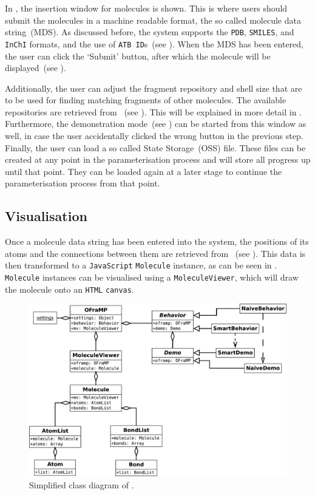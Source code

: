 In , the insertion window for molecules is shown. This is where users should submit the molecules in a machine readable format, the so called molecule data string~(MDS). As discussed before, the system supports the \verb|PDB|, \verb|SMILES|, and \verb|InChI| formats, and the use of \verb|ATB ID|s~(see ). When the MDS has been entered, the user can click the `Submit' button, after which the molecule will be displayed~(see ).

Additionally, the user can adjust the fragment repository and shell size that are to be used for finding matching fragments of other molecules. The available repositories are retrieved from \omfraf~(see ). This will be explained in more detail in . Furthermore, the demonstration mode~(see ) can be started from this window as well, in case the user accidentally clicked the wrong button in the previous step. Finally, the user can load a so called \oframp{} State Storage~(OSS) file. These files can be created at any point in the parameterisation process and will store all progress up until that point. They can be loaded again at a later stage to continue the parameterisation process from that point.


\subsection{Visualisation}
Once a molecule data string has been entered into the system, the positions of its atoms and the connections between them are retrieved from \oapoc~(see ). This data is then transformed to a \verb|JavaScript| \verb|Molecule| instance, as can be seen in . \verb|Molecule| instances can be visualised using a \verb|MoleculeViewer|, which will draw the molecule onto an \verb|HTML| \verb|canvas|.

\begin{figure}
\begin{center}
\includegraphics[width=\textwidth]{img/oframp_class.pdf}
\caption{Simplified class diagram of \oframp.}
\end{center}
\end{figure}

